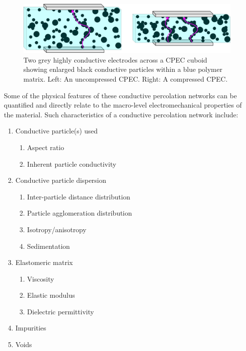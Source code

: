 \begin{figure}[H]
    \centering
    \includegraphics[width=0.7\linewidth]{Figures/res_deformed_states_x2_crop.jpg}
    \caption{Two grey highly conductive electrodes across a CPEC cuboid showing enlarged black conductive particles within a blue polymer matrix. Left: An uncompressed CPEC. Right: A compressed CPEC.}
    \label{fig:res_deformed_cube}
\end{figure}

Some of the physical features of these conductive percolation networks can be quantified and directly relate to the macro-level electromechanical properties of the material. Such characteristics of a conductive percolation network include:
\begin{enumerate}
    \item Conductive particle(s) used
    \begin{enumerate}
        \item Aspect ratio \cite{Wu2019,Flandin1999}
        \item Inherent particle conductivity
    \end{enumerate}
    \item Conductive particle dispersion \cite{Kim2012}
    \begin{enumerate}
        \item Inter-particle distance distribution
        \item Particle agglomeration distribution \cite{Pegel2008}
        \item Isotropy/anisotropy \cite{Song2022}
        \item Sedimentation \cite{Eklund2019}
    \end{enumerate}
    \item Elastomeric matrix
    \begin{enumerate}
        \item Viscosity
        \item Elastic modulus
        \item Dielectric permittivity
    \end{enumerate}
    \item Impurities
    \item Voids
\end{enumerate}

